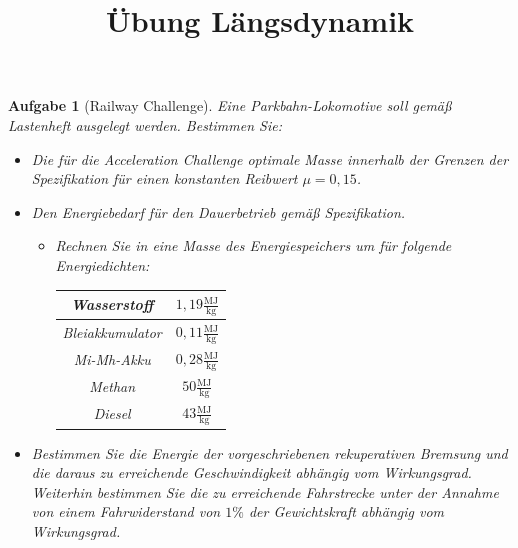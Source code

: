 \documentclass[11pt,a4paper,headsepline]{scrartcl}
\title{\"Ubung L\"angsdynamik}
\date{}
\newtheorem{aufgabe}{Aufgabe}
\begin{document}
\maketitle
\thispagestyle{fancy}
\pagestyle{fancy}
\vspace{-2cm}

\begin{aufgabe}[Railway Challenge]
\label{Ta:Acceleration}
Eine Parkbahn-Lokomotive soll gem\"a{\ss} Lastenheft ausgelegt werden. Bestimmen Sie:
\begin{itemize}
	\item Die f\"ur die Acceleration Challenge optimale Masse innerhalb der Grenzen der Spezifikation f\"ur einen konstanten Reibwert $\mu = 0{,}15$.
	\item Den Energiebedarf f\"ur den Dauerbetrieb gem\"a{\ss} Spezifikation.
	\begin{itemize}
		\item Rechnen Sie in eine Masse des Energiespeichers um f\"ur folgende Energiedichten: \vspace{.2cm} \\ 
		\centering
		\begin{tabular}{|c|c|}
		\hline
		Wasserstoff & $1{,}19 \frac{\mathrm{MJ}}{\mathrm{kg}}$ \\ \hline
		Bleiakkumulator & $0{,}11 \frac{\mathrm{MJ}}{\mathrm{kg}}$ \\ \hline
		Mi-Mh-Akku & $0{,}28 \frac{\mathrm{MJ}}{\mathrm{kg}}$ \\ \hline
		Methan & $50 \frac{\mathrm{MJ}}{\mathrm{kg}}$ \\ \hline
		Diesel & $43 \frac{\mathrm{MJ}}{\mathrm{kg}}$ \\ \hline
		\end{tabular}
		\end{itemize}
		\item Bestimmen Sie die Energie der vorgeschriebenen rekuperativen Bremsung und die daraus zu erreichende Geschwindigkeit abh\"angig vom Wirkungsgrad. Weiterhin bestimmen Sie die zu erreichende Fahrstrecke unter der Annahme von einem Fahrwiderstand von $1\%$ der Gewichtskraft abh\"angig vom Wirkungsgrad.
\end{itemize}
\end{aufgabe}
\newpage
\end{document}
